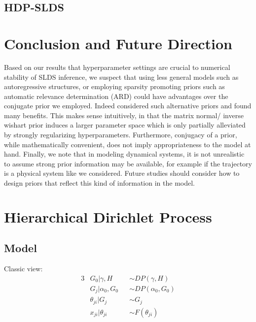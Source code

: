 \documentclass{article} %
\begin{document}
\subsection{HDP-SLDS}

\section{Conclusion and Future Direction}

Based on our results that hyperparameter settings are crucial to numerical stability of SLDS inference, we suspect that using less general models such as autoregressive structures, or employing sparsity promoting priors such as automatic relevance determination (ARD) could have advantages over the conjugate prior we employed. Indeed \cite{fox_bayesian_2009} considered such alternative priors and found many benefits. This makes sense intuitively, in that the matrix normal/ inverse wishart prior induces a larger parameter space which is only partially alleviated by strongly regularizing hyperparameters. Furthermore, conjugacy of a prior, while mathematically convenient, does not imply appropriateness to the model at hand. Finally, we note that in modeling dynamical systems, it is not unrealistic to assume strong prior information may be available, for example if the trajectory is a physical system like we considered. Future studies should consider how to design priors that reflect this kind of information in the model.


\clearpage
\appendix
\section{Hierarchical Dirichlet Process}

\subsection{Model}

Classic view:
\begin{alignat*}{3}
& G_0 | \gamma, H && \sim DP(\gamma, H) \\
& G_j | \alpha_0, G_0 && \sim DP(\alpha_0, G_0) \\
& \theta_{ji} | G_j && \sim G_j \\
& x_{ji} | \theta_{ji} && \sim F(\theta_{ji})
\end{alignat*}
\end{document}
